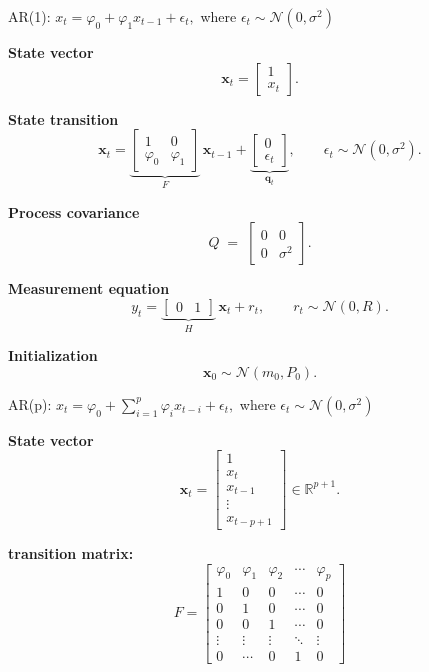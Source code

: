 AR(1): $x_t = \varphi_0 + \varphi_1 x_{t-1} + \epsilon_t,$ where $\epsilon_t \sim \mathcal{N}(0, \sigma^2)$

\textbf{State vector}
\[
\mathbf x_t =
\begin{bmatrix}
1\\ x_t
\end{bmatrix}.
\]

\textbf{State transition}
\[
\mathbf x_t =
\underbrace{\begin{bmatrix}
1 & 0\\
\varphi_0 & \varphi_1
\end{bmatrix}}_{F}\,
\mathbf x_{t-1}
+
\underbrace{\begin{bmatrix}
0\\ \epsilon_t
\end{bmatrix}}_{\mathbf q_t},
\qquad
\epsilon_t \sim \mathcal N(0,\sigma^2).
\]

\textbf{Process covariance}
\[
Q \;=\;
\begin{bmatrix}
0 & 0\\
0 & \sigma^2
\end{bmatrix}.
\]

\textbf{Measurement equation}
\[
y_t = 
\underbrace{\begin{bmatrix} 0 & 1 \end{bmatrix}}_{H}\,\mathbf x_t + r_t,
\qquad
r_t \sim \mathcal N(0,R).
\]

\textbf{Initialization}
\[
\mathbf x_0 \sim \mathcal N(m_0, P_0).
\]

\noindent AR(p): $x_t = \varphi_0 + \sum_{i=1}^p \varphi_i x_{t-i} + \epsilon_t,$ where  $\epsilon_t \sim \mathcal{N}(0, \sigma^2)$

\textbf{State vector}
\[
\mathbf{x}_t =
\begin{bmatrix}
1 \\
x_t \\
x_{t-1} \\
\vdots \\
x_{t-p+1}
\end{bmatrix} \in \mathbb{R}^{p+1}.
\]

\textbf{transition matrix:}
\[
F =
\begin{bmatrix}
\varphi_0 & \varphi_1 & \varphi_2 & \cdots & \varphi_p \\
1 & 0 & 0 & \cdots & 0 \\
0 & 1 & 0 & \cdots & 0 \\
0 & 0 & 1 & \cdots & 0 \\
\vdots & \vdots & \vdots & \ddots & \vdots \\
0 & \cdots & 0 & 1 & 0 
\end{bmatrix}
\]

